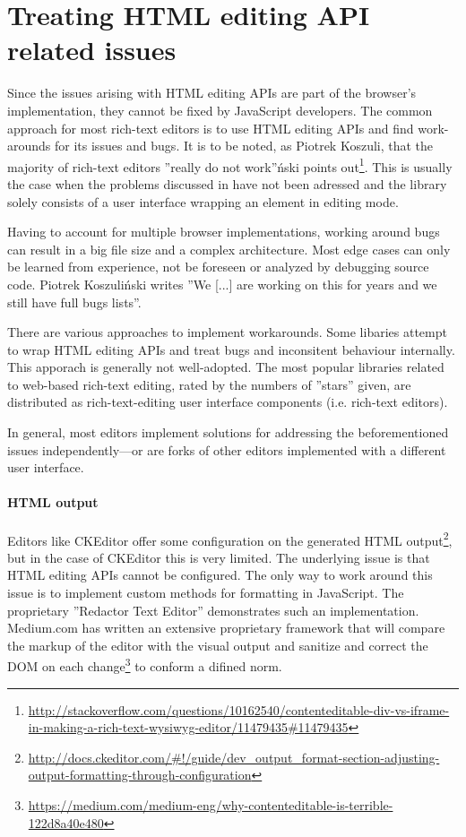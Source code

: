 
\section{Treating HTML editing API related issues}
\label{sec:ed_api_treating}

Since the issues arising with HTML editing APIs are part of the browser's implementation, they cannot be fixed by JavaScript developers. The common approach for most rich-text editors is to use HTML editing APIs and find work-arounds for its issues and bugs. It is to be noted, as Piotrek Koszuli, that the majority of rich-text editors ''really do not work''\'{n}ski points out\footnote{\url{http://stackoverflow.com/questions/10162540/contenteditable-div-vs-iframe-in-making-a-rich-text-wysiwyg-editor/11479435\#11479435}}. This is usually the case when the problems discussed in  have not been adressed and the library solely consists of a user interface wrapping an element in editing mode.

Having to account for multiple browser implementations, working around bugs can result in a big file size and a complex architecture. Most edge cases can only be learned from experience, not be foreseen or analyzed by debugging source code. Piotrek Koszuli\'{n}ski writes ''We [...] are working on this for years and we still have full bugs lists''\cite{sopp}.

There are various approaches to implement workarounds. Some libaries attempt to wrap HTML editing APIs and treat bugs and inconsitent behaviour internally. This apporach is generally not well-adopted. The most popular libraries related to web-based rich-text editing, rated by the numbers of ''stars'' given, are distributed as rich-text-editing user interface components (i.e. rich-text editors).

In general, most editors implement solutions for addressing the beforementioned issues independently---or are forks of other editors implemented with a different user interface.

\paragraph{HTML output} Editors like CKEditor offer some configuration on the generated HTML output\footnote{\url{http://docs.ckeditor.com/\#!/guide/dev\_output\_format-section-adjusting-output-formatting-through-configuration}}, but in the case of CKEditor this is very limited. The underlying issue is that HTML editing APIs cannot be configured. The only way to work around this issue is to implement custom methods for formatting in JavaScript. The proprietary ''Redactor Text Editor'' demonstrates such an implementation. Medium.com has written an extensive proprietary framework that will compare the markup of the editor with the visual output and sanitize and correct the DOM on each change\footnote{\url{https://medium.com/medium-eng/why-contenteditable-is-terrible-122d8a40e480}} to conform a difined norm.

